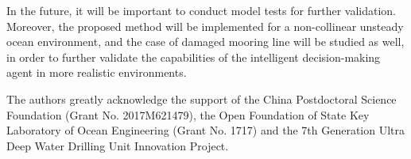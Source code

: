 \begin{sloppypar}
In the future, it will be important to conduct model tests for further validation. Moreover, the proposed method will be implemented for a non-collinear unsteady ocean environment, and the case of damaged mooring line will be studied as well, in order to further validate the capabilities of the intelligent decision-making agent in more realistic environments.


\begin{acknowledgements}
The authors greatly acknowledge the support of the China Postdoctoral Science Foundation  (Grant No. 2017M621479), the Open Foundation of State Key Laboratory of Ocean Engineering (Grant No. 1717) and the 7th Generation Ultra Deep Water Drilling Unit Innovation Project.
\end{acknowledgements}

\end{sloppypar}

